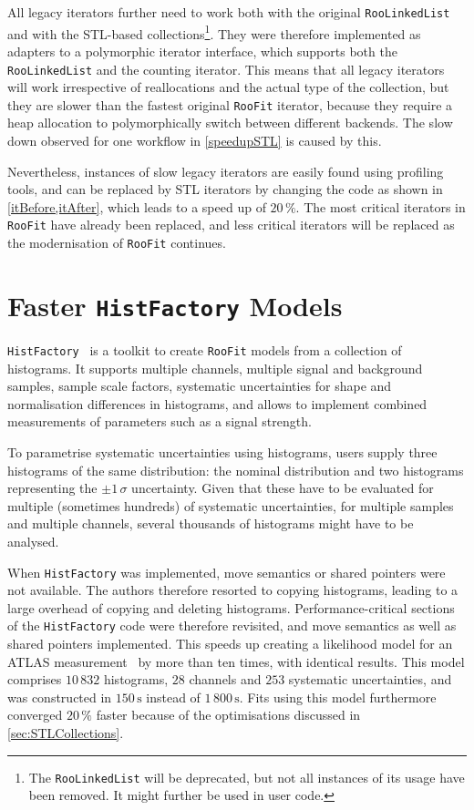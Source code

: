 \documentclass[a4paper]{jpconf}
\newcommand{\RooFit}{\texttt{RooFit}\xspace}
\newcommand{\HistFactory}{\texttt{HistFactory}\xspace}
\begin{document}
All legacy iterators further need to work both with the original \texttt{RooLinkedList} and
with the STL-based collections\footnote{The \texttt{RooLinkedList} will be deprecated, but not all instances of its usage have been removed.
It might further be used in user code.}. They were therefore implemented as adapters to a polymorphic iterator interface, which
supports both the \texttt{RooLinkedList} and the counting iterator. This means that all legacy iterators will work irrespective of
reallocations and the actual type of the collection, but they are slower than the fastest original \RooFit iterator, because they
require a heap allocation to polymorphically switch between different  backends. The slow down observed for one workflow in
\cref{speedupSTL} is caused by this.

Nevertheless, instances of slow legacy iterators are easily found using profiling tools, and can be replaced by STL
iterators by changing the code as shown in \cref{itBefore,itAfter}, which leads to a speed up of $20\,\%$. The most critical iterators in \RooFit have already been replaced,
and less critical iterators will be replaced as the modernisation of \RooFit continues.





\section{Faster \HistFactory Models\label{sec:HistFactory}}
\HistFactory~\cite{HistFactory} is a toolkit to create \RooFit models from a collection of histograms. It supports multiple channels,
multiple signal and background samples, sample scale factors, systematic uncertainties for shape and normalisation differences in histograms, and allows to implement combined measurements of parameters such as a signal strength.

To parametrise systematic uncertainties using histograms, users supply three histograms of the same distribution: the nominal distribution
and two histograms representing the $\pm 1\, \sigma$ uncertainty. Given that these have to be evaluated for multiple (sometimes hundreds) of
systematic uncertainties, for multiple samples and multiple channels, several thousands of histograms might have to be analysed.

When \HistFactory was implemented, move semantics or shared pointers were not available. The authors therefore resorted to copying
histograms, leading to a large overhead of copying and deleting histograms. Performance-critical sections of 
the \HistFactory code were therefore revisited, and move semantics as well as shared pointers implemented. This speeds up creating a likelihood
model for an ATLAS measurement~\cite{Hbb} by more than ten times, with identical results. This model comprises $10\,832$
histograms, $28$ channels and $253$ systematic uncertainties, and was constructed in $150\,\mathrm{s}$ instead of $1\,800\,\mathrm{s}$. Fits using this model furthermore
converged $20\,\%$ faster because of the optimisations discussed in \cref{sec:STLCollections}.
\end{document}
